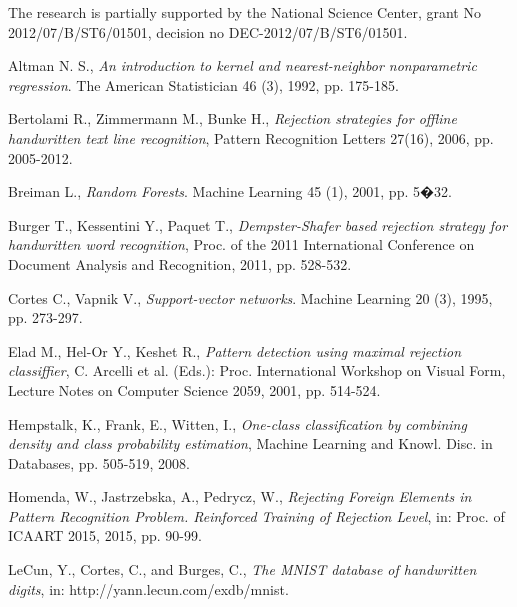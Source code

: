 \documentclass{llncs}
\begin{document}
\noindent The research is partially supported  by the National Science Center, grant No 2012/07/B/ST6/01501, decision no \mbox{DEC-2012/07/B/ST6/01501}.


\begin{thebibliography}{1}

Altman N. S., \emph{An introduction to kernel and nearest-neighbor nonparametric regression}. The American Statistician 46 (3), 1992, pp. 175-185.

Bertolami R., Zimmermann M., Bunke H., \emph{Rejection strategies for offline handwritten text line recognition}, Pattern Recognition Letters 27(16), 2006, pp. 2005-2012.

Breiman L., \emph{Random Forests}. Machine Learning 45 (1), 2001, pp. 5�32. 

Burger T., Kessentini Y., Paquet T., \emph{Dempster-Shafer based rejection strategy for handwritten word recognition}, Proc. of the 2011 International Conference on Document Analysis and Recognition, 2011, pp. 528-532.

Cortes C., Vapnik V., \emph{Support-vector networks}. Machine Learning 20 (3), 1995, pp. 273-297.
 
Elad M., Hel-Or Y., Keshet R., \emph{Pattern detection using maximal rejection classiffier}, C. Arcelli et al. (Eds.): Proc. International Workshop on Visual Form, Lecture Notes on Computer Science 2059, 2001, pp. 514-524.
 
Hempstalk, K., Frank, E., Witten, I., \emph{One-class classification by combining density and class probability estimation}, Machine Learning and Knowl. Disc. in Databases, pp. 505-519, 2008.

Homenda, W., Jastrzebska, A., Pedrycz, W., \emph{Rejecting Foreign Elements in Pattern Recognition Problem. Reinforced Training of Rejection Level}, in: Proc. of ICAART 2015, 2015, pp. 90-99.


LeCun, Y., Cortes, C., and Burges, C., \emph{The MNIST database of handwritten digits}, in: http://yann.lecun.com/exdb/mnist.


\end{thebibliography}
\end{document}
